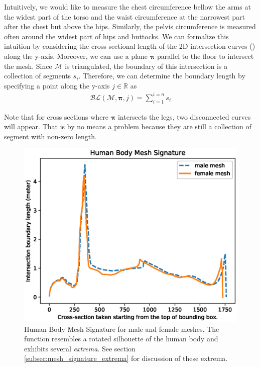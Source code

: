 \documentclass[10pt,twocolumn,letterpaper]{article}
\begin{document}
Intuitively, we would like to measure the chest circumference bellow the arms 
at the widest part of the torso and the waist circumference at the 
narrowest part after the chest but above the hips. Similarly, the pelvis 
circumference is measured often around the widest part of hips and buttocks. We 
can formalize this intuition by considering the cross-sectional length of the 
2D intersection curves (\cite{book.compu.topo}) along the y-axis. Moreover, we 
can 
use a plane $\boldsymbol{\pi}$ parallel to the floor to intersect the mesh. 
Since $\mathcal{M}$ is 
triangulated, the boundary of this 
intersection is a collection of segments $s_i$. Therefore, we can 
determine the boundary length by specifying a point along the y-axis $j \in 
\mathbb{R}$ as
\begin{align}
\mathcal{BL}(\mathcal{M}, \boldsymbol{\pi}, j) = \sum_{i = 
1}^{i = n}s_i
\end{align}

Note that for cross sections where $\boldsymbol{\pi}$ intersects the legs, two 
disconnected curves will appear. That is by no means a problem because they are 
still a collection of segment with non-zero length.

\begin{figure}[t]
	\begin{center}
		\includegraphics[width=\linewidth]{Figure_1.eps}
	\end{center}
	\caption{Human Body Mesh Signature for male and female meshes. The 
		function resembles a rotated silhouette of the human body and exhibits 
		several \textit{extrema}. See section 
		\ref{subsec:mesh_signature_extrema} for discussion of these extrema.}
	\label{fig:hbm_signature}
\end{figure}
\end{document}
